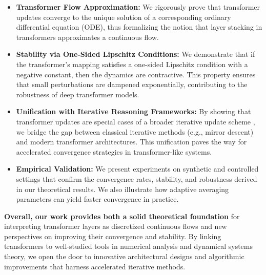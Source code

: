 \begin{itemize}
    \item \textbf{Transformer Flow Approximation:} We rigorously prove that transformer updates converge to the unique solution of a corresponding ordinary differential equation (ODE), thus formalizing the notion that layer stacking in transformers approximates a continuous flow.

    \item \textbf{Stability via One-Sided Lipschitz Conditions:} We demonstrate that if the transformer’s mapping satisfies a one-sided Lipschitz condition with a negative constant, then the dynamics are contractive. This property ensures that small perturbations are dampened exponentially, contributing to the robustness of deep transformer models.

    \item \textbf{Unification with Iterative Reasoning Frameworks:} By showing that transformer updates are special cases of a broader iterative update scheme \citep{feinashley2025iterate}, we bridge the gap between classical iterative methods (e.g., mirror descent) and modern transformer architectures. This unification paves the way for accelerated convergence strategies in transformer-like systems.

    \item \textbf{Empirical Validation:} We present experiments on synthetic and controlled settings that confirm the convergence rates, stability, and robustness derived in our theoretical results. We also illustrate how adaptive averaging parameters can yield faster convergence in practice.
\end{itemize}

\textbf{Overall, our work provides both a solid theoretical foundation} for interpreting transformer layers as discretized continuous flows and new perspectives on improving their convergence and stability. By linking transformers to well-studied tools in numerical analysis and dynamical systems theory, we open the door to innovative architectural designs and algorithmic improvements that harness accelerated iterative methods. 
